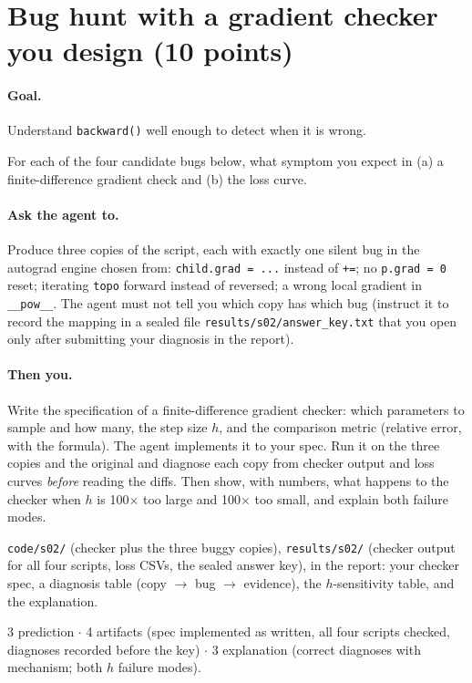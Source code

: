 \documentclass[11pt,letterpaper]{article}
\newcommand{\agent}[1]{\paragraph{Ask the agent to.} #1}
\newcommand{\you}[1]{\paragraph{Then you.} #1}
\newcommand{\goal}[1]{\paragraph{Goal.} #1}
\begin{document}
\section{Bug hunt with a gradient checker you design \hfill (10 points)}
\goal{Understand \texttt{backward()} well enough to detect when it is wrong.}
\begin{predict}
For each of the four candidate bugs below, what symptom you expect in (a) a finite-difference gradient check and (b) the loss curve.
\end{predict}
\agent{Produce three copies of the script, each with exactly one silent bug in the autograd engine chosen from: \texttt{child.grad = ...} instead of \texttt{+=}; no \texttt{p.grad = 0} reset; iterating \texttt{topo} forward instead of reversed; a wrong local gradient in \texttt{\_\_pow\_\_}. The agent must not tell you which copy has which bug (instruct it to record the mapping in a sealed file \texttt{results/s02/answer\_key.txt} that you open only after submitting your diagnosis in the report).}
\you{Write the specification of a finite-difference gradient checker: which parameters to sample and how many, the step size $h$, and the comparison metric (relative error, with the formula). The agent implements it to your spec. Run it on the three copies and the original and diagnose each copy from checker output and loss curves \emph{before} reading the diffs. Then show, with numbers, what happens to the checker when $h$ is 100$\times$ too large and 100$\times$ too small, and explain both failure modes.}
\begin{deliver}
\texttt{code/s02/} (checker plus the three buggy copies), \texttt{results/s02/} (checker output for all four scripts, loss CSVs, the sealed answer key), in the report: your checker spec, a diagnosis table (copy $\to$ bug $\to$ evidence), the $h$-sensitivity table, and the explanation.
\end{deliver}
\begin{rubric}3 prediction $\cdot$ 4 artifacts (spec implemented as written, all four scripts checked, diagnoses recorded before the key) $\cdot$ 3 explanation (correct diagnoses with mechanism; both $h$ failure modes).\end{rubric}

\end{document}
